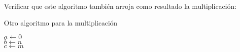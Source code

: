 \begin{ejer}
    Verificar que este algoritmo también arroja como resultado la multiplicación:
    
    \begin{algoritmo}
    \caption{Otro algoritmo para la multiplicación}\label{alg:otromult}
    $a \leftarrow 0$ \\
    $b \leftarrow n$ \\
    $c \leftarrow m$ \\
    \end{algoritmo}
\end{ejer}